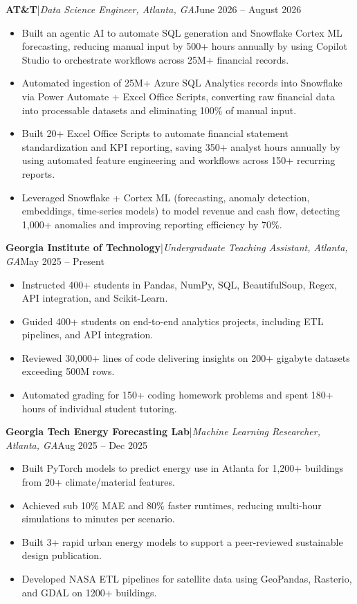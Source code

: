 \documentclass[11pt,letterpaper]{article}
\newcommand{\ressection}[1]{\vspace{6pt}{\fontsize{12}{13}\selectfont\bfseries\scshape #1}\par\vspace{1pt}}
\newcommand{\entry}[3]{\textbf{#1}\enspace|\enspace\textit{#2}\hfill #3\par}
\begin{document}
\ressection{Relevant Experience}
\entry{AT\&T}{Data Science Engineer, Atlanta, GA}{June 2026 -- August 2026}
\begin{itemize}
  \item Built an agentic AI to automate SQL generation and Snowflake Cortex ML forecasting, reducing manual input by 500+ hours annually by using Copilot Studio to orchestrate workflows across 25M+ financial records.
  \item Automated ingestion of 25M+ Azure SQL Analytics records into Snowflake via Power Automate + Excel Office Scripts, converting raw financial data into processable datasets and eliminating 100\% of manual input.
  \item Built 20+ Excel Office Scripts to automate financial statement standardization and KPI reporting, saving 350+ analyst hours annually by using automated feature engineering and workflows across 150+ recurring reports.
  \item Leveraged Snowflake + Cortex ML (forecasting, anomaly detection, embeddings, time-series models) to model revenue and cash flow, detecting 1,000+ anomalies and improving reporting efficiency by 70\%.
\end{itemize}
\vspace{3pt}
\entry{Georgia Institute of Technology}{Undergraduate Teaching Assistant, Atlanta, GA}{May 2025 -- Present}
\begin{itemize}
  \item Instructed 400+ students in Pandas, NumPy, SQL, BeautifulSoup, Regex, API integration, and Scikit-Learn.
  \item Guided 400+ students on end-to-end analytics projects, including ETL pipelines, and API integration.
  \item Reviewed 30,000+ lines of code delivering insights on 200+ gigabyte datasets exceeding 500M rows.
  \item Automated grading for 150+ coding homework problems and spent 180+ hours of individual student tutoring.
\end{itemize}
\vspace{3pt}
\entry{Georgia Tech Energy Forecasting Lab}{Machine Learning Researcher, Atlanta, GA}{Aug 2025 -- Dec 2025}
\begin{itemize}
  \item Built PyTorch models to predict energy use in Atlanta for 1,200+ buildings from 20+ climate/material features.
  \item Achieved sub 10\% MAE and 80\% faster runtimes, reducing multi-hour simulations to minutes per scenario.
  \item Built 3+ rapid urban energy models to support a peer-reviewed sustainable design publication.
  \item Developed NASA ETL pipelines for satellite data using GeoPandas, Rasterio, and GDAL on 1200+ buildings.
\end{itemize}
\end{document}

